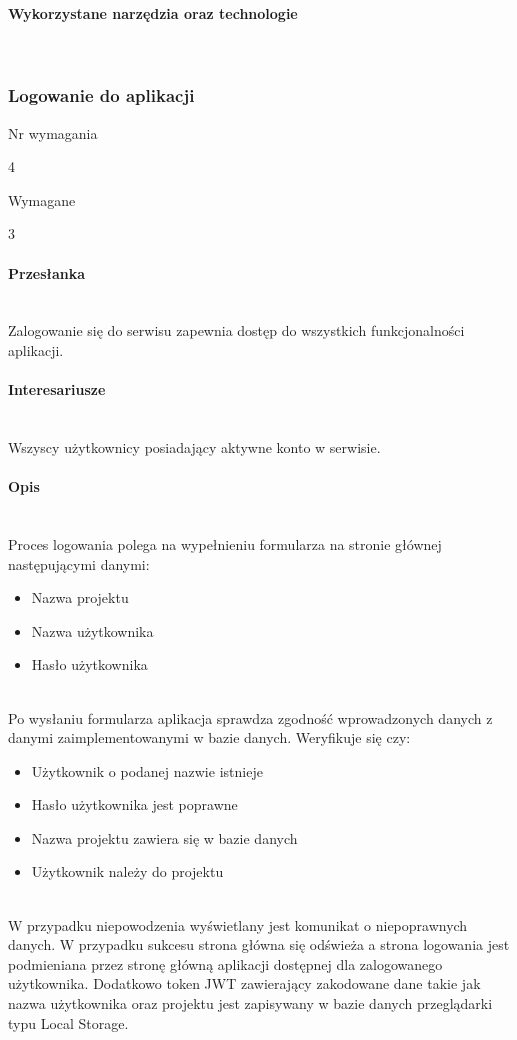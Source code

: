 \documentclass[eng,printmode]{mgr}
\begin{document}
\paragraph{Wykorzystane narzędzia oraz technologie}\ \\
\newpage

\subsubsection{Logowanie do aplikacji}
\begin{labeling}{Nr wymagania}
\item [Nr wymagania:] 4
\item [Typ:] Wymagane
\item [Powiązania:] 3
\end{labeling}

\paragraph{Przesłanka}\ \\
Zalogowanie się do serwisu zapewnia dostęp do wszystkich funkcjonalności aplikacji.

\paragraph{Interesariusze}\ \\
Wszyscy użytkownicy posiadający aktywne konto w serwisie.

\paragraph{Opis}\ \\
Proces logowania polega na wypełnieniu formularza na stronie głównej następującymi danymi:
\begin{itemize}
	\item[--] Nazwa projektu
	\item[--] Nazwa użytkownika
	\item[--] Hasło użytkownika
\end{itemize}
\ \\
Po wysłaniu formularza aplikacja sprawdza zgodność wprowadzonych danych z danymi zaimplementowanymi w bazie danych. Weryfikuje się czy:
\begin{itemize}
	\item[--] Użytkownik o podanej nazwie istnieje
	\item[--] Hasło użytkownika jest poprawne
	\item[--] Nazwa projektu zawiera się w bazie danych
	\item[--] Użytkownik należy do projektu
\end{itemize}
\ \\
W przypadku niepowodzenia wyświetlany jest komunikat o niepoprawnych danych. W przypadku sukcesu strona główna się odświeża a strona logowania jest podmieniana przez stronę główną aplikacji dostępnej dla zalogowanego użytkownika. Dodatkowo token JWT zawierający zakodowane dane takie jak nazwa użytkownika oraz projektu jest zapisywany w bazie danych przeglądarki typu Local Storage\cite {local_storage}.
\end{document}
